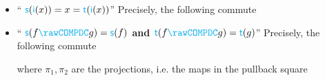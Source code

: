 \documentclass[noamsfonts, reqno]{amsart}
\newcommand\sDC{\mathcolor{cyan}{\mathsf{s}}}
\newcommand\tDC{\mathcolor{cyan}{\mathsf{t}}}
\newcommand\iDC{\mathcolor{cyan}{\mathsf{i}}}
\newcommand{\COMPDC}{\mathcolor{cyan}{\rawCOMPDC}}
\newcommand\id{\operatorname{id}}
\begin{document}
\begin{itemize}

\item
``\textbf{ $\sDC(\iDC(x)) = x = \tDC(\iDC(x))$}''\newline
Precisely, the following commute
\begin{center}
\end{center}

\item 
``\textbf{ $\sDC( f \COMPDC g ) = \sDC(f)$ and $\tDC( f \COMPDC g ) = \tDC(g)$}''\newline
Precisely, the following commute
\begin{center}
\end{center}
where $\pi_1, \pi_2$ are the projections, i.e. the maps in the pullback square
\begin{center}
\end{center}


\end{itemize}
\end{document}
